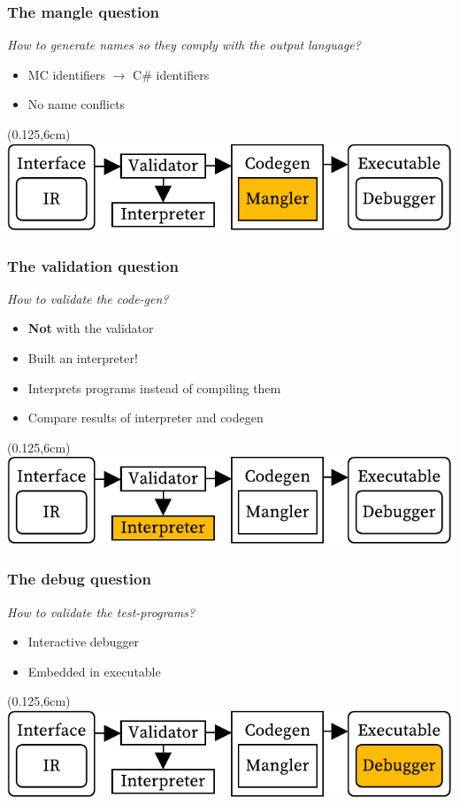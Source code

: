 \documentclass[xetex,serif,aspectratio=169]{beamer}
\begin{document}
\begin{frame}[t]
\end{frame}\begin{frame}[t]\frametitle{The mangle question}
\textit{How to generate names so they comply with the output language?}
\begin{itemize}
    \item MC identifiers $\longrightarrow$ C\# identifiers
    \item No name conflicts
\end{itemize}
\begin{textblock*}{0.75\paperwidth}(0.125\paperwidth,6cm)\includegraphics[width=0.75\paperwidth]{overview_mangler}\end{textblock*}

\end{frame}\begin{frame}[t]\frametitle{The validation question}
\textit{How to validate the code-gen?}
\begin{itemize}
    \item \textbf{Not} with the validator
    \item Built an interpreter!
    \item Interprets programs instead of compiling them
    \item Compare results of interpreter and codegen
\end{itemize}
\begin{textblock*}{0.75\paperwidth}(0.125\paperwidth,6cm)\includegraphics[width=0.75\paperwidth]{overview_validation}\end{textblock*}

\end{frame}\begin{frame}[t]\frametitle{The debug question}
\textit{How to validate the test-programs?}
\begin{itemize}
    \item Interactive debugger
    \item Embedded in executable
\end{itemize}
\begin{textblock*}{0.75\paperwidth}(0.125\paperwidth,6cm)\includegraphics[width=0.75\paperwidth]{overview_debugger}\end{textblock*}


\end{frame}
\end{document}
